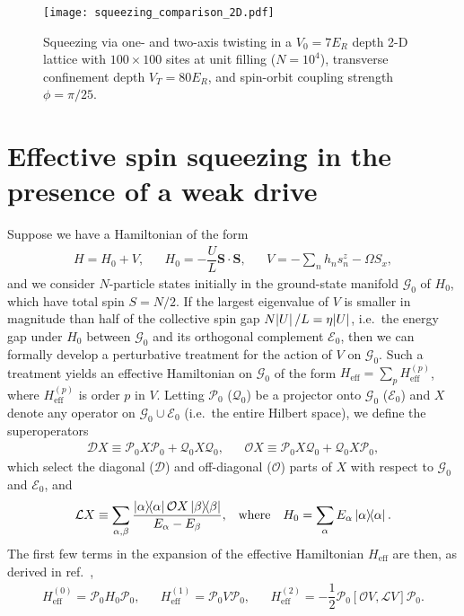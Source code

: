 \documentclass[aps,notitlepage,nofootinbib,11pt]{revtex4-1}
\renewcommand{\t}{\text} %
\newcommand{\f}[2]{\dfrac{#1}{#2}} %
\renewcommand{\sp}[1]{\left[#1\right]} %
\renewcommand{\v}{\bm} %
\renewcommand{\c}{\cdot} %
\newcommand{\D}{\mathcal{D}}
\newcommand{\E}{\mathcal{E}}
\newcommand{\G}{\mathcal{G}}
\renewcommand{\L}{\mathcal{L}}
\renewcommand{\O}{\mathcal{O}}
\renewcommand{\P}{\mathcal{P}}
\newcommand{\Q}{\mathcal{Q}}
\newcommand{\1}{\mathds{1}}
\begin{document}
\begin{figure}
  \centering
  \texttt{[image: squeezing\_comparison\_2D.pdf]}
  \caption{Squeezing via one- and two-axis twisting in a $V_0=7E_R$
    depth 2-D lattice with $100\times100$ sites at unit filling
    ($N=10^4$), transverse confinement depth $V_T=80E_R$, and
    spin-orbit coupling strength $\phi=\pi/25$.}
  \label{fig:squeezing_comparison_2D}
\end{figure}


\newpage
\appendix

\section{Effective spin squeezing in the presence of a weak drive}
\label{sec:squeezing_derivation}

Suppose we have a Hamiltonian of the form
\begin{align}
  H = H_0 + V,
  &&
  H_0 = - \f{U}{L} \v S\c\v S,
  &&
  V = - \sum_n h_n s_n^z - \Omega S_x,
\end{align}
and we consider $N$-particle states initially in the ground-state
manifold $\G_0$ of $H_0$, which have total spin $S=N/2$.  If the
largest eigenvalue of $V$ is smaller in magnitude than half of the
collective spin gap $N\abs{U}/L=\eta\abs{U}$, i.e.~the energy gap
under $H_0$ between $\G_0$ and its orthogonal complement $\E_0$, then
we can formally develop a perturbative treatment for the action of $V$
on $\G_0$.  Such a treatment yields an effective Hamiltonian on $\G_0$
of the form $H_{\t{eff}}=\sum_pH_{\t{eff}}^{(p)}$, where
$H_{\t{eff}}^{(p)}$ is order $p$ in $V$.  Letting $\P_0$ ($\Q_0$) be a
projector onto $\G_0$ ($\E_0$) and $X$ denote any operator on
$\G_0\cup\E_0$ (i.e.~the entire Hilbert space), we define the
superoperators
\begin{align}
  \D X \equiv \P_0 X \P_0 + \Q_0 X \Q_0,
  &&
  \O X \equiv \P_0 X \Q_0 + \Q_0 X \P_0,
\end{align}
which select the diagonal ($\D$) and off-diagonal ($\O$) parts of $X$
with respect to $\G_0$ and $\E_0$, and
\begin{align}
  \L X \equiv \sum_{\alpha,\beta}
  \f{\op{\alpha}\O X\op{\beta}}{E_\alpha-E_\beta},
  &&
  \t{where}
  &&
  H_0 = \sum_\alpha E_\alpha \op\alpha.
\end{align}
The first few terms in the expansion of the effective Hamiltonian
$H_{\t{eff}}$ are then, as derived in
ref.~\cite{bravyi2011schrieffer},
\begin{align}
  H_{\t{eff}}^{(0)} = \P_0 H_0 \P_0,
  &&
  H_{\t{eff}}^{(1)} = \P_0 V \P_0,
  &&
  H_{\t{eff}}^{(2)} = -\f12 \P_0 \sp{\O V,\L V} \P_0.
  \label{eq:H_eff_012}
\end{align}
\end{document}
